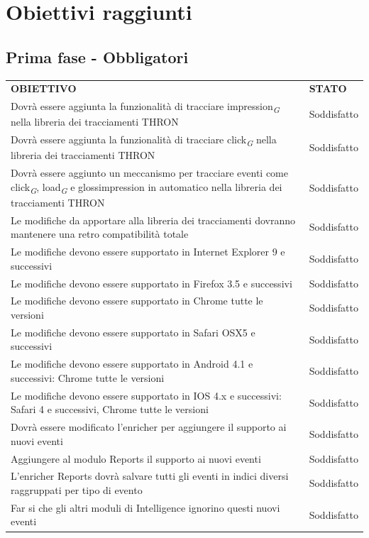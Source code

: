\documentclass[a4paper, 12pt, twoside, openright]{book}
\newcommand{\gloss}[1]{#1\textsubscript{\textit{\tiny{G}}}}
\begin{document}
\section{Obiettivi raggiunti}

\subsection{Prima fase - Obbligatori}
\begin{tabular}{ m{26em} | m{5em} }
	\rowcolor{gray!50}
	\textbf{OBIETTIVO} & \textbf{STATO}\\
	Dovrà essere aggiunta la funzionalità di tracciare \gloss{impression} nella libreria dei tracciamenti THRON & Soddisfatto\\
	Dovrà essere aggiunta la funzionalità di tracciare \gloss{click} nella libreria dei tracciamenti THRON & Soddisfatto\\
	Dovrà essere aggiunto un meccanismo per tracciare eventi come \gloss{click}, \gloss{load} e gloss{impression} in automatico nella libreria dei tracciamenti THRON & Soddisfatto\\
	Le modifiche da apportare alla libreria dei tracciamenti dovranno mantenere una retro compatibilità totale & Soddisfatto\\
	Le modifiche devono essere supportato in Internet Explorer 9 e successivi & Soddisfatto\\
	Le modifiche devono essere supportato in Firefox 3.5 e successivi & Soddisfatto\\
	Le modifiche devono essere supportato in Chrome tutte le versioni & Soddisfatto\\
	Le modifiche devono essere supportato in Safari OSX5 e successivi & Soddisfatto\\
	Le modifiche devono essere supportato in Android 4.1 e successivi: Chrome tutte le versioni & Soddisfatto\\
	Le modifiche devono essere supportato in IOS 4.x e successivi: Safari 4 e successivi, Chrome tutte le versioni & Soddisfatto\\
	Dovrà essere modificato l'enricher per aggiungere il supporto ai nuovi eventi & Soddisfatto\\
	Aggiungere al modulo Reports il supporto ai nuovi eventi & Soddisfatto\\
	L'enricher  Reports dovrà salvare tutti gli eventi in indici diversi raggruppati per tipo di evento & Soddisfatto\\
	Far si che gli altri moduli di Intelligence ignorino questi nuovi eventi & Soddisfatto\\
\end{tabular}
\end{document}
